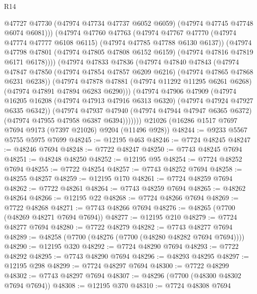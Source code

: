 \begin{lexlean}{R14}
\begin{coremodule}
                @47727
                @47730
                (@47974 @47734 @47737 @6052 @6059)
                (@47974 @47745 @47748 @6074 @6081)))
            (@47974
              @47760
              @47763
              (@47974
                @47767
                @47770
                (@47974 @47774 @47777 @6108 @6115)
                (@47974 @47785 @47788 @6130 @6137))
              (@47974
                @47798
                @47801
                (@47974 @47805 @47808 @6152 @6159)
                (@47974 @47816 @47819 @6171 @6178))))
          (@47974
            @47833
            @47836
            (@47974
              @47840
              @47843
              (@47974
                @47847
                @47850
                (@47974 @47854 @47857 @6209 @6216)
                (@47974 @47865 @47868 @6231 @6238))
              (@47974
                @47878
                @47881
                (@47974 @11292 @11295 @6261 @6268)
                (@47974 @47891 @47894 @6283 @6290)))
            (@47974
              @47906
              @47909
              (@47974
                @16205
                @16208
                (@47974 @47913 @47916 @6313 @6320)
                (@47974 @47924 @47927 @6335 @6342))
              (@47974
                @47937
                @47940
                (@47974 @47944 @47947 @6365 @6372)
                (@47974 @47955 @47958 @6387 @6394)))))))
    @21026
    (@16286 @1517 @7697 @7694 @9173 (@7397 @21026) @9204 (@11496 @928))
@48244 := @9233 @5567 @5755 @5975 @7699
@48245 := @12195 @463
@48246 := @7724 @48245
@48247 := @48246 @7694
@48248 := @7722 @48247
@48250 := @7743 @48245 @7694
@48251 := @48248 @48250
@48252 := @12195 @95
@48254 := @7724 @48252 @7694
@48255 := @7722 @48254
@48257 := @7743 @48252 @7694
@48258 := @48255 @48257
@48259 := @12195 @170
@48261 := @7724 @48259 @7694
@48262 := @7722 @48261
@48264 := @7743 @48259 @7694
@48265 := @48262 @48264
@48266 := @12195 @22
@48268 := @7724 @48266 @7694
@48269 := @7722 @48268
@48271 := @7743 @48266 @7694
@48276 := @48265 (@7700 (@48269 @48271 @7694 @7694))
@48277 := @12195 @210
@48279 := @7724 @48277 @7694
@48280 := @7722 @48279
@48282 := @7743 @48277 @7694
@48289 := @48258 (@7700 (@48276 (@7700 (@48280 @48282 @7694 @7694))))
@48290 := @12195 @320
@48292 := @7724 @48290 @7694
@48293 := @7722 @48292
@48295 := @7743 @48290 @7694
@48296 := @48293 @48295
@48297 := @12195 @298
@48299 := @7724 @48297 @7694
@48300 := @7722 @48299
@48302 := @7743 @48297 @7694
@48307 := @48296 (@7700 (@48300 @48302 @7694 @7694))
@48308 := @12195 @370
@48310 := @7724 @48308 @7694

\end{coremodule}
\end{lexlean}
